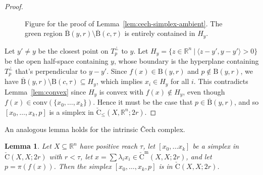 \documentclass{amsart}
\theoremstyle{plain}
\newtheorem{lemma}{Lemma}[section]
\theoremstyle{definition}
\theoremstyle{myremark}
\newcommand{\R}{\mathbb{R}}
\newcommand{\conv}{\mathrm{conv}}
\newcommand{\ball}[2]{\mathrm{B}(#1,#2)}
\newcommand{\cball}[2]{\overline{\mathrm{B}}(#1,#2)}
\newcommand{\cecha}[3]{\mathrm{\check{C}}(#1,#2;#3)}
\newcommand{\cechaleq}[3]{\mathrm{\check{C}_{\le}}(#1,#2;#3)}
\newcommand{\cecham}[3]{\mathrm{\check{C}^m}(#1,#2;#3)}
\begin{document}
\begin{proof}
\begin{figure}[h]
\def\svgwidth{2in}

\caption{Figure for the proof of Lemma~\ref{lem:cech-simplex-ambient}. The green region $\cball{y}{r}\setminus\cball{c}{\tau}$ is entirely contained in $H_y$.}
\end{figure}

Let $y'\neq y$ be the closest point on $T_p^\perp$ to $y$.
Let $H_y=\{z\in\R^n~|~\langle z-y',y-y'\rangle>0\}$ be the open half-space containing $y$, whose boundary is the hyperplane containing $T_p^\perp$ that's perpendicular to $y-y'$.
Since $f(x)\in\ball{y}{r}$ and $p\notin\ball{y}{r}$, we have $\cball{y}{r} \setminus \ball{c}{\tau} \subseteq H_y$, which implies $x_i \in H_y$ for all $i$.
This contradicts Lemma~\ref{lem:convex} since $H_y$ is convex with $f(x)\notin H_y$, even though $f(x)\in\conv(\{x_0,\ldots,x_k\})$.
Hence it must be the case that $p \in \cball{y}{r}$, and so $[x_0 , \ldots , x_k , p ]$ is a simplex in $\cechaleq{X}{\R^n}{2r}$.
\end{proof}

\FloatBarrier

An analogous lemma holds for the intrinsic \v{C}ech complex.

\begin{lemma}\label{lem:cech-simplex-intrinsic}
Let $X\subseteq\R^n$ have positive reach $\tau$, let $[x_0, \ldots x_k]$ be a simplex in $\cecha{X}{X}{2r}$ with $r < \tau$, let $x = \sum \lambda_i x_i\in\cecham{X}{X}{2r}$, and let $p=\pi(f(x))$.
Then the simplex $[x_0 , \ldots , x_k , p]$ is in $\cecha{X}{X}{2r}$.
\end{lemma}
\end{document}
